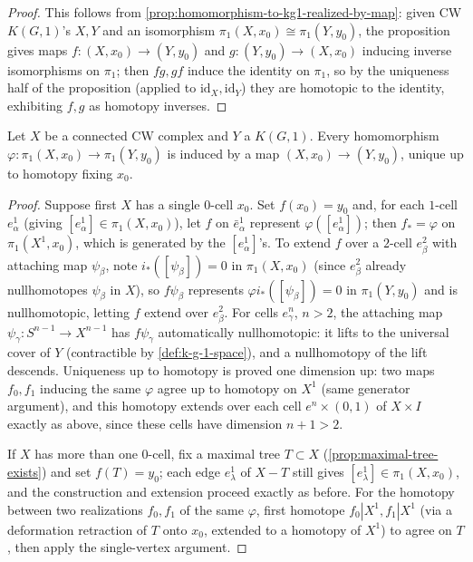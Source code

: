 \begin{proof}
This follows from \cref{prop:homomorphism-to-kg1-realized-by-map}: given CW
$K(G,1)$'s $X,Y$ and an isomorphism $\pi_1(X,x_0)\cong\pi_1(Y,y_0)$, the proposition
gives maps $f:(X,x_0)\to(Y,y_0)$ and $g:(Y,y_0)\to(X,x_0)$ inducing inverse
isomorphisms on $\pi_1$; then $fg,gf$ induce the identity on $\pi_1$, so by the
uniqueness half of the proposition (applied to $\mathrm{id}_X,\mathrm{id}_Y$) they are
homotopic to the identity, exhibiting $f,g$ as homotopy inverses.
\end{proof}

\begin{proposition}
\label{prop:homomorphism-to-kg1-realized-by-map}
Let $X$ be a connected CW complex and $Y$ a $K(G,1)$. Every homomorphism
$\varphi:\pi_1(X,x_0)\to\pi_1(Y,y_0)$ is induced by a map $(X,x_0)\to(Y,y_0)$, unique up
to homotopy fixing $x_0$.
\end{proposition}

\begin{proof}
Suppose first $X$ has a single $0$-cell $x_0$. Set $f(x_0)=y_0$ and, for each $1$-cell
$e^1_\alpha$ (giving $[e^1_\alpha]\in\pi_1(X,x_0)$), let $f$ on $\bar e^1_\alpha$ represent
$\varphi([e^1_\alpha])$; then $f_*=\varphi$ on $\pi_1(X^1,x_0)$, which is generated by the
$[e^1_\alpha]$'s. To extend $f$ over a $2$-cell $e^2_\beta$ with attaching map $\psi_\beta$, note
$i_*([\psi_\beta])=0$ in $\pi_1(X,x_0)$ (since $e^2_\beta$ already nullhomotopes $\psi_\beta$ in
$X$), so $f\psi_\beta$ represents $\varphi i_*([\psi_\beta])=0$ in $\pi_1(Y,y_0)$ and is
nullhomotopic, letting $f$ extend over $e^2_\beta$. For cells $e^n_\gamma$, $n>2$, the
attaching map $\psi_\gamma:S^{n-1}\to X^{n-1}$ has $f\psi_\gamma$ automatically
nullhomotopic: it lifts to the universal cover of $Y$ (contractible by
\cref{def:k-g-1-space}), and a nullhomotopy of the lift descends. Uniqueness up to
homotopy is proved one dimension up: two maps $f_0,f_1$ inducing the same $\varphi$
agree up to homotopy on $X^1$ (same generator argument), and this homotopy
extends over each cell $e^n\times(0,1)$ of $X\times I$ exactly as above, since these
cells have dimension $n+1>2$.

If $X$ has more than one $0$-cell, fix a maximal tree $T\subset X$
(\cref{prop:maximal-tree-exists}) and set $f(T)=y_0$; each edge $e^1_\lambda$ of $X-T$
still gives $[e^1_\lambda]\in\pi_1(X,x_0)$, and the construction and extension proceed
exactly as before. For the homotopy between two realizations $f_0,f_1$ of the same
$\varphi$, first homotope $f_0|X^1,f_1|X^1$ (via a deformation retraction of $T$ onto
$x_0$, extended to a homotopy of $X^1$) to agree on $T$, then apply the
single-vertex argument.
\end{proof}

